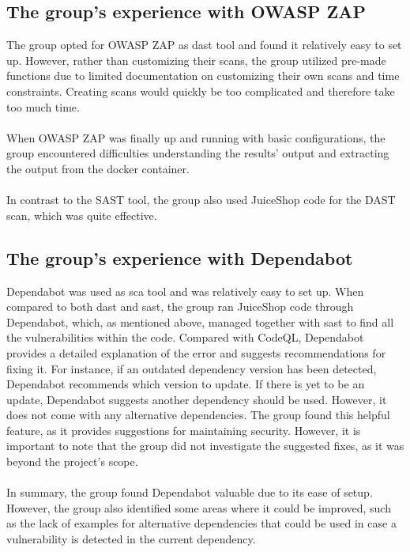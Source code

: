 \subsection{The group's experience with OWASP ZAP}

The group opted for OWASP ZAP as \acrshort{dast} tool and found it relatively easy to set up. However, rather than customizing their scans, the group utilized pre-made functions due to limited documentation on customizing their own scans and time constraints. Creating scans would quickly be too complicated and therefore take too much time. 
\\~\\
When OWASP ZAP was finally up and running with basic configurations, the group encountered difficulties understanding the results' output and extracting the output from the docker container. 
\\~\\
In contrast to the SAST tool, the group also used JuiceShop code for the  DAST scan, which was quite effective. 



\subsection{The group's experience with Dependabot}
Dependabot was used as \acrshort{sca} tool and was relatively easy to set up. When compared to both \acrshort{dast} and \acrshort{sast}, the group ran JuiceShop code through Dependabot, which, as mentioned above, managed together with \acrshort{sast} to find all the vulnerabilities within the code. 
Compared with CodeQL, Dependabot provides a detailed explanation of the error and suggests recommendations for fixing it. For instance, if an outdated dependency version has been detected, Dependabot recommends which version to update. If there is yet to be an update, Dependabot suggests another dependency should be used. However, it does not come with any alternative dependencies. The group found this helpful feature, as it provides suggestions for maintaining security. However, it is important to note that the group did not investigate the suggested fixes, as it was beyond the project's scope.
\\~\\
In summary, the group found Dependabot valuable due to its ease of setup. However, the group also identified some areas where it could be improved, such as the lack of examples for alternative dependencies that could be used in case a vulnerability is detected in the current dependency. 


